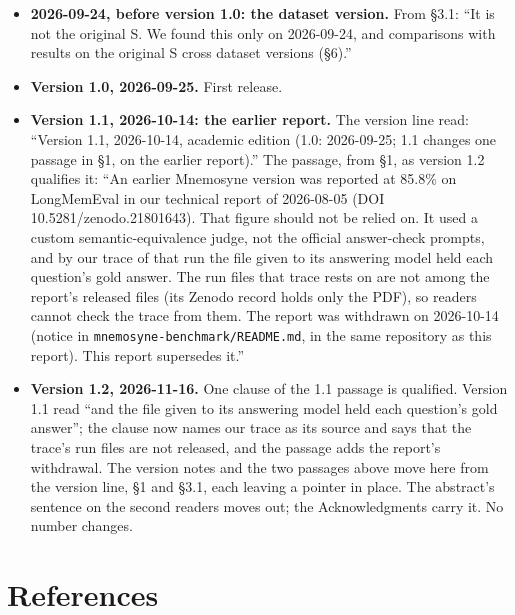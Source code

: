 \documentclass[11pt]{article}
\begin{document}
\begin{itemize}
\item
  \textbf{2026-09-24, before version 1.0: the dataset version.} From §3.1: ``It is not the original S. We
  found this only on 2026-09-24, and comparisons with results on the original S cross dataset versions (§6).''
\item
  \textbf{Version 1.0, 2026-09-25.} First release.
\item
  \textbf{Version 1.1, 2026-10-14: the earlier report.} The version line read: ``Version 1.1, 2026-10-14,
  academic edition (1.0: 2026-09-25; 1.1 changes one passage in §1, on the earlier report).'' The passage,
  from §1, as version 1.2 qualifies it: ``An earlier Mnemosyne version was reported at 85.8\% on LongMemEval
  in our technical report of 2026-08-05 (DOI 10.5281/zenodo.21801643). That figure should not be relied on.
  It used a custom semantic-equivalence judge, not the official answer-check prompts, and by our trace of that
  run the file given to its answering model held each question's gold answer. The run files that
  trace rests on are not among the report's released files (its Zenodo record holds only the PDF), so readers
  cannot check the trace from them. The report was withdrawn on 2026-10-14 (notice in
  \texttt{mnemosyne-benchmark/README.md}, in the same repository as this report). This report supersedes it.''
\item
  \textbf{Version 1.2, 2026-11-16.} One clause of the 1.1 passage is qualified. Version 1.1 read ``and the file
  given to its answering model held each question's gold answer''; the clause now names our trace
  as its source and says that the trace's run files are not released, and the passage adds the
  report's withdrawal. The version notes and the two passages above move here from the version line, §1 and
  §3.1, each leaving a pointer in place. The abstract's sentence on the second readers moves out; the
  Acknowledgments carry it. No number changes.
\end{itemize}

\hypertarget{references}{%
\section{References}\label{references}}
\end{document}
